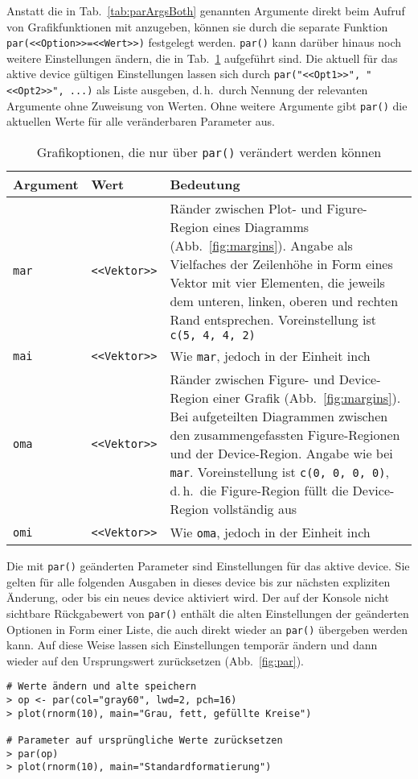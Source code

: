Anstatt die in Tab.\ \ref{tab:parArgsBoth} genannten Argumente direkt beim Aufruf von Grafikfunktionen mit anzugeben, können sie durch die separate Funktion \lstinline!par(<<Option>>=<<Wert>>)! festgelegt werden. \lstinline!par()! kann darüber hinaus noch weitere Einstellungen ändern, die in Tab.\ \ref{tab:parArgsPar} aufgeführt sind. Die aktuell für das aktive device gültigen Einstellungen lassen sich durch \lstinline!par("<<Opt1>>", "<<Opt2>>", ...)! als Liste ausgeben, d.\,h.\ durch Nennung der relevanten Argumente ohne Zuweisung von Werten. Ohne weitere Argumente gibt \lstinline!par()! die aktuellen Werte für alle veränderbaren Parameter aus.

\begin{table}[ht]
\centering
\caption{Grafikoptionen, die nur über \lstinline!par()! verändert werden können}
\label{tab:parArgsPar}
\begin{tabular}{p{1.5cm}p{1.6cm}p{9.4cm}}
\hline
\sffamily Argument & \sffamily Wert & \sffamily Bedeutung\\\hline\hline
\lstinline!mar! & \lstinline!<<Vektor>>! & Ränder zwischen Plot- und Figure-Region eines Diagramms (Abb.\ \ref{fig:margins}). Angabe als Vielfaches der Zeilenhöhe in Form eines Vektor mit vier Elementen, die jeweils dem unteren, linken, oberen und rechten Rand entsprechen. Voreinstellung ist \lstinline!c(5, 4, 4, 2)!\\
\lstinline!mai! & \lstinline!<<Vektor>>! & Wie \lstinline!mar!, jedoch in der Einheit inch\\
\lstinline!oma! & \lstinline!<<Vektor>>! & Ränder zwischen Figure- und Device-Region einer Grafik (Abb.\ \ref{fig:margins}). Bei aufgeteilten Diagrammen zwischen den zusammengefassten Figure-Regionen und der Device-Region. Angabe wie bei \lstinline!mar!. Voreinstellung ist \lstinline!c(0, 0, 0, 0)!, d.\,h.\ die Figure-Region füllt die Device-Region vollständig aus\\
\lstinline!omi! & \lstinline!<<Vektor>>! & Wie \lstinline!oma!, jedoch in der Einheit inch\\\hline
\end{tabular}
\end{table}

Die mit \lstinline!par()! geänderten Parameter sind Einstellungen für das aktive device. Sie gelten für alle folgenden Ausgaben in dieses device bis zur nächsten expliziten Änderung, oder bis ein neues device aktiviert wird. Der auf der Konsole nicht sichtbare Rückgabewert von \lstinline!par()! enthält die alten Einstellungen der geänderten Optionen in Form einer Liste, die auch direkt wieder an \lstinline!par()! übergeben werden kann. Auf diese Weise lassen sich Einstellungen temporär ändern und dann wieder auf den Ursprungswert zurücksetzen (Abb.\ \ref{fig:par}).
\begin{lstlisting}
# Werte ändern und alte speichern
> op <- par(col="gray60", lwd=2, pch=16)
> plot(rnorm(10), main="Grau, fett, gefüllte Kreise")

# Parameter auf ursprüngliche Werte zurücksetzen
> par(op)
> plot(rnorm(10), main="Standardformatierung")
\end{lstlisting}

